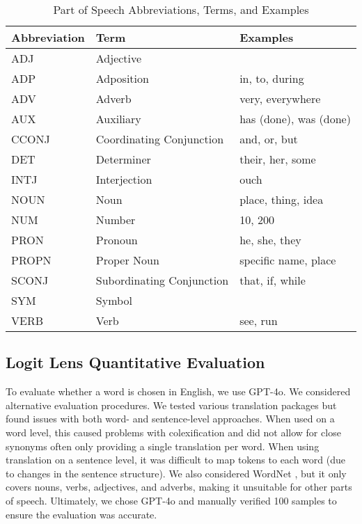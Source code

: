 \begin{table*}[h]
\caption{Part of Speech Abbreviations, Terms, and Examples}
\label{pos-table}
\vskip 0.15in
\begin{center}
\begin{small}
\begin{sc}
\begin{tabular}{l l l} 
\toprule
 Abbreviation &  Term &  Examples \\ \midrule
ADJ & Adjective &  \\
ADP & Adposition & in, to, during \\
ADV & Adverb & very, everywhere \\
AUX & Auxiliary & has (done), was (done) \\
CCONJ & Coordinating Conjunction & and, or, but \\
DET & Determiner & their, her, some \\
INTJ & Interjection & ouch \\
NOUN & Noun & place, thing, idea \\
NUM & Number & 10, 200  \\
PRON & Pronoun & he, she, they \\
PROPN & Proper Noun & specific name, place \\
SCONJ & Subordinating Conjunction & that, if, while \\
SYM & Symbol &  \\
VERB & Verb & see, run  \\ \bottomrule 

\end{tabular}
\end{sc}
\end{small}
\end{center}
\vskip -0.1in
\end{table*}


\subsection{Logit Lens Quantitative Evaluation} \label{sec:appendix_logit_lens_eval}

To evaluate whether a word is chosen in English, we use GPT-4o. 
We considered alternative evaluation procedures. 
We tested various translation packages but found issues with both word- and sentence-level approaches. When used on a word level, this caused problems with colexification and did not allow for close synonyms often only providing a single translation per word. 
When using translation on a sentence level, it was difficult to map tokens to each word (due to changes in the sentence structure).
We also considered WordNet \citep{miller-1994-wordnet}, but it only covers nouns, verbs, adjectives, and adverbs, making it unsuitable for other parts of speech.
Ultimately, we chose GPT-4o and manually verified 100 samples to ensure the evaluation was accurate.

